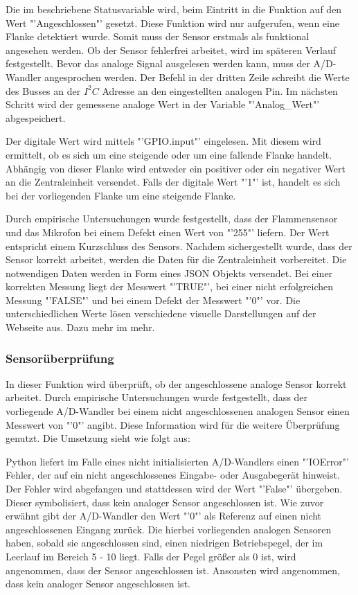 	Die im  beschriebene Statusvariable wird, beim Eintritt in die Funktion auf den Wert "'Angeschlossen"' gesetzt. Diese Funktion wird nur aufgerufen, wenn eine Flanke detektiert wurde. Somit muss der Sensor erstmals als funktional angesehen werden. Ob der Sensor fehlerfrei arbeitet, wird im späteren Verlauf festgestellt. Bevor das analoge Signal ausgelesen werden kann, muss der \ac{A/D-Wandler} angesprochen werden. Der Befehl in der dritten Zeile schreibt die Werte des Busses an der $I^2C$ Adresse an den eingestellten analogen Pin. Im nächsten Schritt wird der gemessene analoge Wert in der Variable "'Analog\_Wert"' abgespeichert. 
	
	Der digitale Wert wird mittels "'GPIO.input"' eingelesen. Mit diesem wird ermittelt, ob es sich um eine steigende oder um eine fallende Flanke handelt. Abhängig von dieser Flanke wird entweder ein positiver oder ein negativer Wert an die Zentraleinheit versendet. Falls der digitale Wert "'1"' ist, handelt es sich bei der vorliegenden Flanke um eine steigende Flanke. 

	Durch empirische Untersuchungen wurde festgestellt, dass der Flammensensor und das Mikrofon bei einem Defekt einen Wert von "'255"' liefern. Der Wert entspricht einem Kurzschluss des Sensors. Nachdem sichergestellt wurde, dass der Sensor korrekt arbeitet, werden die Daten für die Zentraleinheit vorbereitet. Die notwendigen Daten werden in Form eines \ac{JSON} Objekts versendet. Bei einer korrekten Messung liegt der Messwert "'TRUE"', bei einer nicht erfolgreichen Messung "'FALSE"' und bei einem Defekt der Messwert "'0"' vor. Die unterschiedlichen Werte lösen verschiedene visuelle Darstellungen auf der Webseite aus. Dazu mehr im  mehr.
	
\subsubsection*{Sensorüberprüfung} \label{Sensorueberpruefung}
	In dieser Funktion wird überprüft, ob der angeschlossene analoge Sensor korrekt arbeitet. Durch empirische Untersuchungen wurde festgestellt, dass der vorliegende \ac{A/D-Wandler} bei einem nicht angeschlossenen analogen Sensor einen Messwert von "'0"' angibt. Diese Information wird für die weitere Überprüfung genutzt. Die Umsetzung sieht wie folgt aus:
	
	Python liefert im Falle eines nicht initialisierten \acp{A/D-Wandler} einen "'IOError"' Fehler, der auf ein nicht angeschlossenes Eingabe- oder Ausgabegerät hinweist. Der Fehler wird abgefangen und stattdessen wird der Wert "'False"' übergeben. Dieser symbolisiert, dass kein analoger Sensor angeschlossen ist. Wie zuvor erwähnt gibt der \ac{A/D-Wandler} den Wert "'0"' als Referenz auf einen nicht angeschlossenen Eingang zurück. Die hierbei vorliegenden analogen Sensoren haben, sobald sie angeschlossen sind, einen niedrigen Betriebspegel, der im Leerlauf im Bereich 5 - 10 liegt. Falls der Pegel größer als 0 ist, wird angenommen, dass der Sensor angeschlossen ist. Ansonsten wird angenommen, dass kein analoger Sensor angeschlossen ist.
